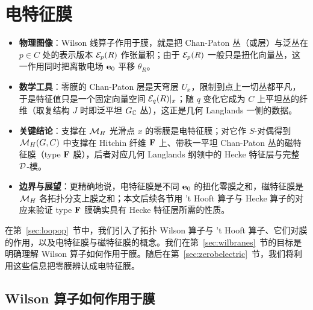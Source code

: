 
\section{电特征膜}

\label{sec:electricbranes}

\begin{keytakeaways}
  \begin{itemize}[leftmargin=1.4em,itemsep=2pt,topsep=2pt]
    \item \textbf{物理图像}：Wilson 线算子作用于膜，就是把 Chan-Paton 丛（或层）与泛丛在 $p\in C$ 处的表示版本 ${\EUE}_p(R)$ 作张量积；由于 ${\EUE}_p(R)$ 一般只是扭化向量丛，这一作用同时把离散电场 ${\bf e}_0$ 平移 $\theta_R$。
    \item \textbf{数学工具}：零膜的 Chan-Paton 层是天穹层 $U_x$，限制到点上一切丛都平凡，于是特征值只是一个固定向量空间 ${\EUE}_q(R)|_x$；随 $q$ 变化它成为 $C$ 上平坦丛的纤维（取复结构 $J$ 时即泛平坦 $G_{\Bbb{C}}$ 丛），这正是几何 Langlands 一侧的数据。
    \item \textbf{关键结论}：支撑在 $\MH$ 光滑点 $x$ 的零膜是电特征膜；对它作 $S$-对偶得到 $\MH(G,C)$ 中支撑在 Hitchin 纤维 ${\CMF}$ 上、带秩一平坦 Chan-Paton 丛的磁特征膜（type ${\CMF}$ 膜），后者对应几何 Langlands 纲领中的 Hecke 特征层与完整 ${\cal D}$-模。
    \item \textbf{边界与展望}：更精确地说，电特征膜是不同 ${\bf e}_0$ 的扭化零膜之和，磁特征膜是 $\MH$ 各拓扑分支上膜之和；本文后续各节用 't Hooft 算子与 Hecke 算子的对应来验证 type ${\CMF}$ 膜确实具有 Hecke 特征层所需的性质。
  \end{itemize}
\end{keytakeaways}

在第~\ref{sec:loopop}~节中，我们引入了拓扑 Wilson 算子与 't Hooft 算子、它们对膜的作用，以及电特征膜与磁特征膜的概念。我们在第~\ref{sec:wilbranes}~节的目标是明确理解 Wilson 算子如何作用于膜。随后在第~\ref{sec:zerobelectric}~节，我们将利用这些信息把零膜辨认成电特征膜。

\subsection{Wilson 算子如何作用于膜}

